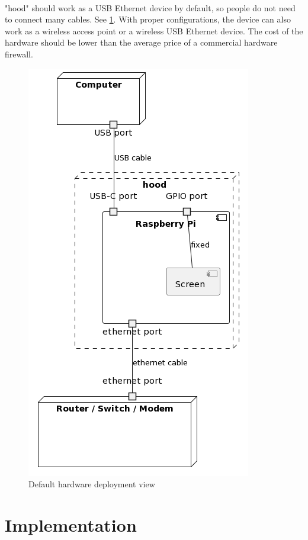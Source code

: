 \documentclass[mscthesis]{usiinfthesis}
\begin{document}
\paragraph{}
"hood" should work as a USB Ethernet device by default, so people do not need to connect many cables. See \cref{fig:hardware-deployment-view}. With proper configurations, the device can also work as a wireless access point or a wireless USB Ethernet device. The cost of the hardware should be lower than the average price of a commercial hardware firewall.
\begin{figure}[H]
  \includegraphics[scale=1]{graphics/puml/hardware-deployment-view.png}
  \caption{Default hardware deployment view}
  \label{fig:hardware-deployment-view}
\end{figure}

\section{Implementation}
\end{document}
